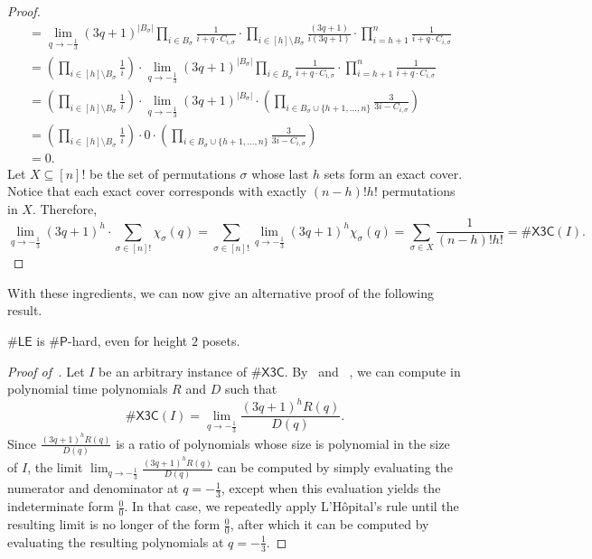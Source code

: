 \documentclass[11pt]{amsart}
\begin{document}
\begin{proof}
\begin{align*}
      &= \lim_{q \to -\frac{1}{3}}  (3q+1)^{|B_\sigma|} \prod_{i \in B_\sigma} \frac{1}{i + q \cdot C_{i, \sigma}}  \cdot \prod_{i \in [h] \setminus B_\sigma} \frac{(3q+1)}{i(3q+1)}  \cdot \prod_{i=h+1}^{n} \frac{1}{i + q\cdot C_{i, \sigma} }\\
        &= \left(\prod_{i \in [h] \setminus B_\sigma} \frac{1}{i}\right) \cdot \lim_{q \to -\frac{1}{3}} (3q+1)^{|B_\sigma|} \prod_{i \in B_\sigma} \frac{1}{i + q \cdot C_{i, \sigma}}  \cdot \prod_{i=h+1}^{n} \frac{1}{i + q\cdot C_{i, \sigma} } \\
      &= \left(\prod_{i \in [h] \setminus B_\sigma} \frac{1}{i}\right) \cdot \lim_{q \to -\frac{1}{3}}  (3q+1)^{|B_\sigma|} \cdot \left(\prod_{i \in B_\sigma \cup \{h+1, \dots, n\}} \frac{3}{3i - C_{i, \sigma}}\right)\\
      &= \left(\prod_{i \in [h] \setminus B_\sigma} \frac{1}{i}\right) \cdot 0 \cdot \left(\prod_{i \in B_\sigma \cup \{h+1, \dots, n\}} \frac{3}{3i - C_{i, \sigma}}\right)\\
      &= 0.
\end{align*}
Let $X \subseteq [n]!$ be the set of permutations $\sigma$ whose last $h$ sets form an exact cover. Notice that each exact cover corresponds with exactly $(n-h)!h!$ permutations in $X$. Therefore,
\[
\lim_{q \to -\frac{1}{3}} (3q+1)^h  \cdot \sum_{\sigma \in [n]!} \chi_{\sigma}(q) = \sum_{\sigma \in [n]!} \lim_{q \to -\frac{1}{3}} (3q+1)^h \chi_{\sigma}(q) = \sum_{\sigma \in X}{\frac{1}{(n-h)!h!}} = \#\mathsf{X3C}(I).
\]    
\end{proof}

With these ingredients, we can now give an alternative proof of the following result.

\begin{thm}\label{thm:h2le}
$\#\mathsf{LE}$ is $\#\mathsf{P}$-hard, even for height $2$ posets.
\end{thm}

\begin{proof}[Proof of~]
    Let $I$ be an arbitrary instance of $\#\mathsf{X3C}$.
    By~ and ~, we can compute in polynomial time polynomials $R$ and $D$ such that
    \[
        \#\mathsf{X3C}(I) = \lim_{q \to -\frac{1}{3}} \frac{(3q+1)^h R(q)}{D(q)}.
    \]
    Since
$\frac{(3q+1)^h R(q)}{D(q)}$
is a ratio of polynomials whose size is polynomial in the size of $I$, the limit
$\lim_{q \to -\frac{1}{3}} \frac{(3q+1)^h R(q)}{D(q)}$
can be computed by simply evaluating the numerator and denominator at $q=-\frac{1}{3}$, except when this evaluation yields the indeterminate form $\frac{0}{0}$. In that case, we repeatedly apply L'Hôpital's rule until the resulting limit is no longer of the form $\frac{0}{0}$, after which it can be computed by evaluating the resulting polynomials at $q=-\frac{1}{3}$.
\end{proof}
\end{document}
